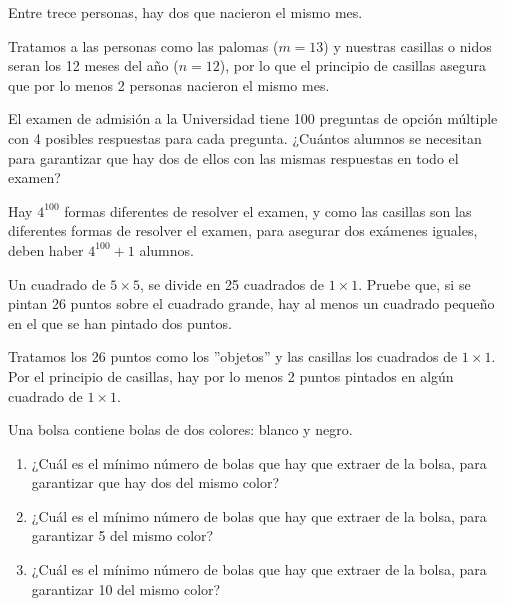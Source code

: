 \begin{ejemplo}
    Entre trece personas, hay dos que nacieron el mismo mes.
\end{ejemplo}

\begin{solucion}
    Tratamos a las personas como las palomas ($m=13$) y nuestras casillas o nidos seran los 12 meses del año ($n=12$), por lo que el principio de casillas asegura que por lo menos 2 personas nacieron el mismo mes.
\end{solucion}

\begin{ejemplo}
    El examen de admisión a la Universidad tiene 100 preguntas de opción múltiple con 4 posibles respuestas para cada pregunta. ¿Cuántos alumnos se necesitan para garantizar que hay dos de ellos con las mismas respuestas en todo el examen?
\end{ejemplo}

\begin{solucion}
    Hay $4^{100}$ formas diferentes de resolver el examen, y como las casillas son las diferentes formas de resolver el examen, para asegurar dos exámenes iguales, deben haber $4^{100}+1$ alumnos.
\end{solucion}

\begin{ejemplo}
    Un cuadrado de $5 \times 5$, se divide en 25 cuadrados de $1 \times 1$.  Pruebe que, si se pintan 26 puntos sobre el cuadrado grande, hay al menos un cuadrado pequeño en el que se han pintado dos puntos.
\end{ejemplo}

\begin{solucion}
    Tratamos los 26 puntos como los ''objetos'' y las casillas los cuadrados de $1 \times 1$.  Por el principio de casillas, hay por lo menos 2 puntos pintados en algún cuadrado de $1 \times 1$.
\end{solucion}

\begin{ejemplo}
    Una bolsa contiene bolas de dos colores:  blanco y negro.
    \renewcommand{\labelenumi}{\alph{enumi})}
    \begin{enumerate}
        \item ¿Cuál es el mínimo número de bolas que hay que extraer de la bolsa, para garantizar que hay dos del mismo color?
        \item ¿Cuál es el mínimo número de bolas que hay que extraer de la bolsa, para garantizar 5 del mismo color?
        \item ¿Cuál es el mínimo número de bolas que hay que extraer de la bolsa, para garantizar 10 del mismo color?
    \end{enumerate}
\end{ejemplo}

